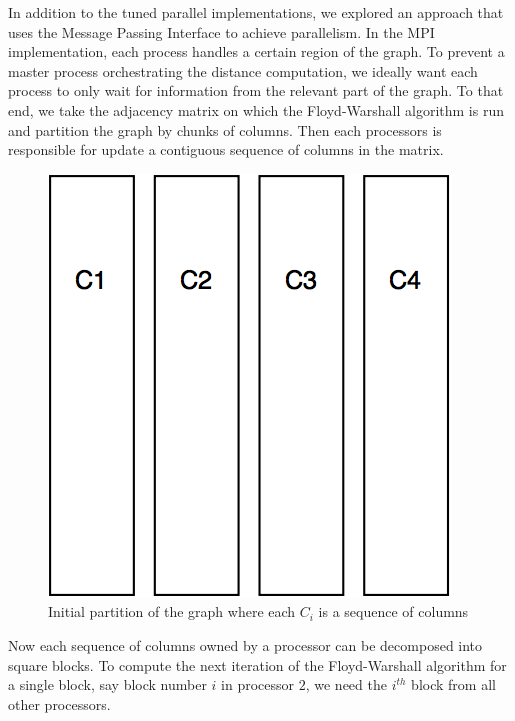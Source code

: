 \documentclass[11pt]{article}
\begin{document}
In addition to the tuned parallel implementations, we explored an approach that uses the Message Passing Interface to achieve parallelism. In the MPI implementation, each process handles a certain region of the graph. To prevent a master process orchestrating the distance computation, we ideally want each process to only wait for information from the relevant part of the graph. To that end, we take the adjacency matrix on which the Floyd-Warshall algorithm is run and partition the graph by chunks of columns. Then each processors is responsible for update a contiguous sequence of columns in the matrix.

\begin{figure}[H]
\centering
\includegraphics[scale=0.25]{initial_partition.png}
\caption{Initial partition of the graph where each $C_i$ is a sequence of columns}
\label{fig:init_part}
\end{figure}

Now each sequence of columns owned by a processor can be decomposed into square blocks. To compute the next iteration of the Floyd-Warshall algorithm for a single block, say block number $i$ in processor $2$, we need the $i^{th}$ block from all other processors.
\end{document}
